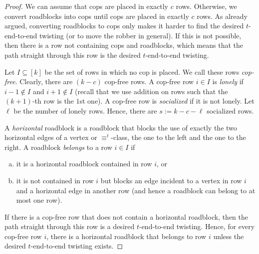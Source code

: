 \documentclass[a4paper,english, thm-restate]{lipics-v2021}
\newcommand{\defining}[1]{\emph{#1}}
\newcommand{\comp}{\equiv}
\begin{document}
\begin{proof}
	
	We can assume that cops are placed in exactly $c$ rows.
	Otherwise, we convert roadblocks into cops
	until cops are placed in exactly $c$ rows.
	As already argued, converting roadblocks to cops only
	makes it harder to find the desired $t$-end-to-end twisting
	(or to move the robber in general).
	If this is not possible, then there is a row not containing cops
	and roadblocks, which means that the path straight through
	this row is the desired $t$-end-to-end twisting.
	
	Let $I\subseteq [k]$ be the set of rows in which no cop is placed.
	We call these rows \defining{cop-free}.
	Clearly, there are $(k - c)$ cop-free rows.
	A cop-free row $i \in I$ is \defining{lonely}
	if $i-1 \notin I$ and $i+1 \notin I$
	(recall that we use addition on rows such that
	the $(k+1)$-th row is the $1$st one).
	A cop-free row is \defining{socialized} if it is not lonely.
	Let $\ell$ be the number of lonely rows.
	Hence, there are $s := k - c - \ell$ socialized rows.
	
	
	A \defining{horizontal} roadblock is a roadblock
	that blocks the use of exactly the two horizontal edges of a vertex or $\comp^t$-class, the one to the left and the one to the right.
	A roadblock \defining{belongs} to a row $i \in I$
	if 
	\begin{enumerate}[(a)]
		\item it is a horizontal roadblock contained in row $i$, or
		\item it is not contained in row $i$
		but blocks an edge incident to a vertex in row $i$
		and a horizontal edge in another row
		(and hence a roadblock can belong to at most one row).
	\end{enumerate}
	
	\noindent If there is a cop-free row
	that does not contain a horizontal roadblock,
	then the path straight through this row
	is a desired $t$-end-to-end twisting. 
	Hence, for every cop-free row $i$, 
	there is a horizontal roadblock that belongs to row $i$
	unless the desired $t$-end-to-end twisting exists.
	

\end{proof}
\end{document}
